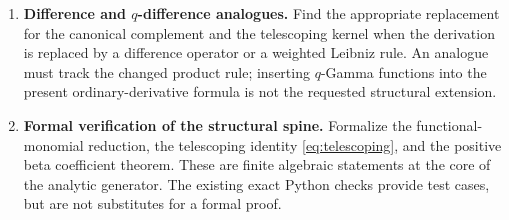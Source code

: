 \begin{enumerate}[leftmargin=*,itemsep=7pt]
\item \textbf{Difference and $q$-difference analogues.}
Find the appropriate replacement for the canonical complement and the telescoping kernel when the derivation is replaced by a difference operator or a weighted Leibniz rule. An analogue must track the changed product rule; inserting $q$-Gamma functions into the present ordinary-derivative formula is not the requested structural extension.

\item \textbf{Formal verification of the structural spine.}
Formalize the functional-monomial reduction, the telescoping identity \eqref{eq:telescoping}, and the positive beta coefficient theorem. These are finite algebraic statements at the core of the analytic generator. The existing exact Python checks provide test cases, but are not substitutes for a formal proof.
\end{enumerate}
